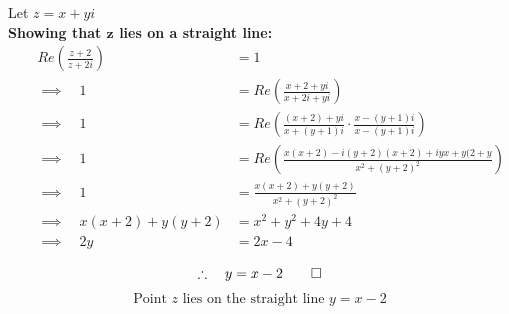 \documentclass[12pt, a4paper]{report}
\theoremstyle{definition}
\begin{document}
	Let $z = x+yi$\\
	\textbf{Showing that $\boldsymbol{z}$ lies on a straight line: }
	\begin{align*}
		&   & Re(\frac{z+2}{z+2i})           & = 1                                                                       \\
		&   & \implies \quad 1               & = Re(\frac{x+2+yi}{x+2i+yi})                                              \\
		&   & \implies \quad 1               & = Re\left(\frac{(x+2)+yi}{x+(y+1)i}\cdot \frac{x-(y+1)i}{x-(y+1)i}\right) \\
		&   & \implies \quad 1               & = Re\left(\frac{x(x+2) -i(y+2)(x+2) + iyx + y(2+y}{x^2 + (y+2)^2}\right)  \\
		&   & \implies \quad 1               & = \frac{x(x+2) + y(y+2)}{x^2 + (y+2)^2}                                   \\
		&   & \implies \quad x(x+2) + y(y+2) & = x^2  + y^2+4y+4                                                         \\
		&   & \implies \quad 2y              & = 2x-4                                                                    \\
	\end{align*}
	$$\therefore \quad y = x-2 \qed$$
	$$\text{Point } z \text{ lies on the straight line } y = x-2$$
	
\end{document}

